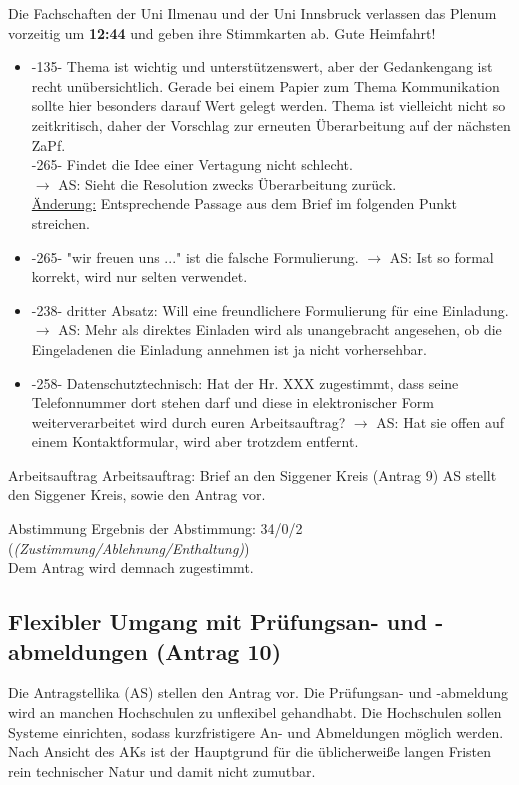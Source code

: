     \begin{info}{}
      Die Fachschaften der Uni Ilmenau und der Uni Innsbruck verlassen das Plenum vorzeitig um \textbf{12:44} und geben ihre Stimmkarten ab. Gute Heimfahrt!
    \end{info}

    \begin{itemize}
      \item -135- Thema ist wichtig und unterstützenswert, aber der Gedankengang ist recht unübersichtlich. Gerade bei einem Papier zum Thema Kommunikation sollte hier besonders darauf Wert gelegt werden. Thema ist vielleicht nicht so zeitkritisch, daher der  Vorschlag zur erneuten Überarbeitung auf der nächsten ZaPf. \\
      -265- Findet die Idee einer Vertagung nicht schlecht. \\
      $\rightarrow$ AS: Sieht die Resolution zwecks Überarbeitung zurück. \\
      \underline{Änderung:} Entsprechende Passage aus dem Brief im folgenden Punkt streichen.
      \item -265- "wir freuen uns ..." ist die falsche Formulierung. $\rightarrow$ AS: Ist so formal korrekt, wird nur selten verwendet.
      \item -238- dritter Absatz: Will eine freundlichere Formulierung für eine Einladung. $\rightarrow$ AS: Mehr als direktes Einladen wird als unangebracht angesehen, ob die Eingeladenen die Einladung annehmen ist ja nicht vorhersehbar.
      \item -258- Datenschutztechnisch: Hat der Hr. XXX zugestimmt, dass seine Telefonnummer dort stehen darf und diese in elektronischer Form weiterverarbeitet wird durch euren Arbeitsauftrag? $\rightarrow$ AS: Hat sie offen auf einem Kontaktformular, wird aber trotzdem entfernt.
    \end{itemize}

    \begin{info}{Arbeitsauftrag}
      Arbeitsauftrag: Brief an den Siggener Kreis (Antrag 9)
      AS stellt den Siggener Kreis, sowie den Antrag vor.
    \end{info}

    \begin{success}{Abstimmung}
      Ergebnis der Abstimmung: 34/0/2 (\textit{(Zustimmung/Ablehnung/Enthaltung)}) \\
      Dem Antrag wird demnach zugestimmt.
    \end{success}

  \subsection{Flexibler Umgang mit Prüfungsan- und -abmeldungen (Antrag 10)}
    Die Antragstellika (AS) stellen den Antrag vor.
    Die Prüfungsan- und -abmeldung wird an manchen Hochschulen zu unflexibel gehandhabt. Die Hochschulen sollen Systeme einrichten, sodass kurzfristigere An- und Abmeldungen möglich werden.
    Nach Ansicht des AKs ist der Hauptgrund für die üblicherweiße langen Fristen rein technischer Natur und damit nicht zumutbar.

